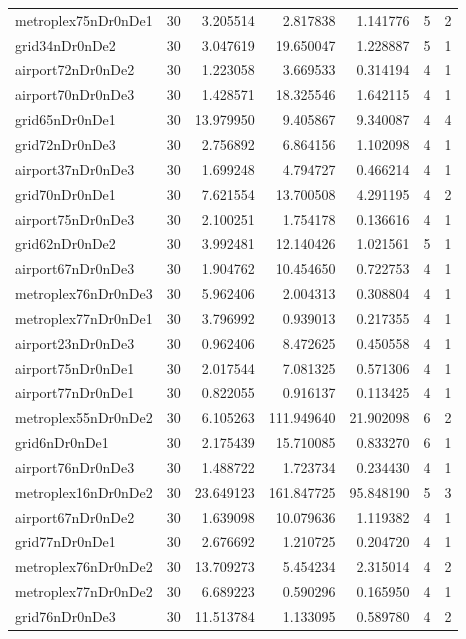 \begin{longtable}{|l|r|r|r|r|r|r|}
metroplex75nDr0nDe1 & 30 & 3.205514 & 2.817838 & 1.141776 & 5 & 2 \\
grid34nDr0nDe2 & 30 & 3.047619 & 19.650047 & 1.228887 & 5 & 1 \\
airport72nDr0nDe2 & 30 & 1.223058 & 3.669533 & 0.314194 & 4 & 1 \\
airport70nDr0nDe3 & 30 & 1.428571 & 18.325546 & 1.642115 & 4 & 1 \\
grid65nDr0nDe1 & 30 & 13.979950 & 9.405867 & 9.340087 & 4 & 4 \\
grid72nDr0nDe3 & 30 & 2.756892 & 6.864156 & 1.102098 & 4 & 1 \\
airport37nDr0nDe3 & 30 & 1.699248 & 4.794727 & 0.466214 & 4 & 1 \\
grid70nDr0nDe1 & 30 & 7.621554 & 13.700508 & 4.291195 & 4 & 2 \\
airport75nDr0nDe3 & 30 & 2.100251 & 1.754178 & 0.136616 & 4 & 1 \\
grid62nDr0nDe2 & 30 & 3.992481 & 12.140426 & 1.021561 & 5 & 1 \\
airport67nDr0nDe3 & 30 & 1.904762 & 10.454650 & 0.722753 & 4 & 1 \\
metroplex76nDr0nDe3 & 30 & 5.962406 & 2.004313 & 0.308804 & 4 & 1 \\
metroplex77nDr0nDe1 & 30 & 3.796992 & 0.939013 & 0.217355 & 4 & 1 \\
airport23nDr0nDe3 & 30 & 0.962406 & 8.472625 & 0.450558 & 4 & 1 \\
airport75nDr0nDe1 & 30 & 2.017544 & 7.081325 & 0.571306 & 4 & 1 \\
airport77nDr0nDe1 & 30 & 0.822055 & 0.916137 & 0.113425 & 4 & 1 \\
metroplex55nDr0nDe2 & 30 & 6.105263 & 111.949640 & 21.902098 & 6 & 2 \\
grid6nDr0nDe1 & 30 & 2.175439 & 15.710085 & 0.833270 & 6 & 1 \\
airport76nDr0nDe3 & 30 & 1.488722 & 1.723734 & 0.234430 & 4 & 1 \\
metroplex16nDr0nDe2 & 30 & 23.649123 & 161.847725 & 95.848190 & 5 & 3 \\
airport67nDr0nDe2 & 30 & 1.639098 & 10.079636 & 1.119382 & 4 & 1 \\
grid77nDr0nDe1 & 30 & 2.676692 & 1.210725 & 0.204720 & 4 & 1 \\
metroplex76nDr0nDe2 & 30 & 13.709273 & 5.454234 & 2.315014 & 4 & 2 \\
metroplex77nDr0nDe2 & 30 & 6.689223 & 0.590296 & 0.165950 & 4 & 1 \\
grid76nDr0nDe3 & 30 & 11.513784 & 1.133095 & 0.589780 & 4 & 2 \\

\end{longtable}
